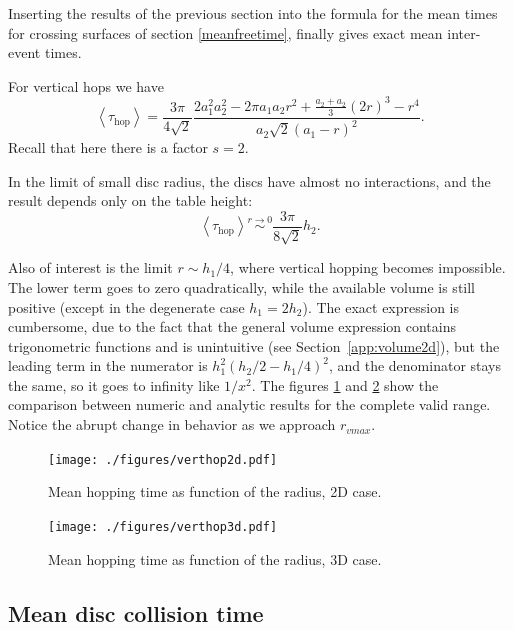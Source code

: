 \documentclass[superscriptaddress,pre,reprint,showpacs,twocolumn]{revtex4-1}
\newcommand{\mean}[1]{\left \langle #1 \right \rangle}
\begin{document}
 
Inserting the results of the previous section 
into the formula for the mean times for crossing
surfaces of section \eqref{meanfreetime}, finally gives exact mean inter-event times.

For vertical
hops we have
\begin{equation}\label{hoptau}
 \mean{\tau_\text{hop}} = 	
\frac{3 \pi}{4\sqrt{2}}
\frac{2 a_1^{2} a_2^{2}  - 2 \pi a_1 a_2 r^{2} + \textstyle \frac{a_2+a_2}{3}  (2r)^{3}  -  r^4}
{ a_2 \sqrt{2}  ( a_1 - r )^2}.
\end{equation}
Recall that here there is a factor $s = 2$.

In the limit of small disc radius, the discs have almost no interactions, and the result depends only
on the table height:
\begin{equation}\label{hoptaulimit}
 \mean{\tau_\text{hop}} \overset{r \to 0}{\sim}
\frac{3 \pi}{8\sqrt{2}}h_2.
\end{equation}

Also of interest is the limit $r\sim h_1/4$, where vertical hopping becomes
impossible.  The lower term goes to zero quadratically, while the available volume
is still positive (except in the degenerate case $h_1=2h_2$). The exact expression
is cumbersome, due to the fact that the general volume expression contains trigonometric functions
 and is unintuitive (see Section~\ref{app:volume2d}),
but the leading term in the numerator is  $h_1^2(h_2/2-h_1/4)^2$, and the denominator
stays the same, so
it goes to infinity
like $1/x^2$. The figures \ref{meanhopp2d} and
\ref{meanhopp3d} show the comparison between
numeric and analytic results for the complete valid range. Notice the abrupt
change in behavior as we approach $r_{vmax}$.

\begin{figure}[h]
  \centering
  \texttt{[image: ./figures/verthop2d.pdf]}
  \caption{Mean hopping time as function of the radius, 2D case.}\label{meanhopp2d}
\end{figure}

\begin{figure}[h]
  \centering
  \texttt{[image: ./figures/verthop3d.pdf]}
  \caption{Mean hopping time as function of the radius, 3D case.}\label{meanhopp3d}
\end{figure}


\subsection{Mean disc collision time}
\end{document}
